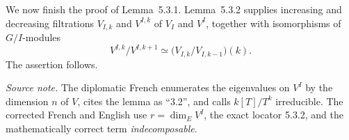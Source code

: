 We now finish the proof of Lemma~5.3.1.  Lemma~5.3.2 supplies increasing and
decreasing filtrations $V_{I,k}$ and $V^{I,k}$ of $V_I$ and $V^I$, together
with isomorphisms of $G/I$-modules
\[
V^{I,k}/V^{I,k+1}\simeq
\bigl(V_{I,k}/V_{I,k-1}\bigr)(k).
\]
The assertion follows.

\medskip
\noindent\emph{Source note.}
The diplomatic French enumerates the eigenvalues on $V^I$ by the dimension
$n$ of $V$, cites the lemma as ``3.2'', and calls $k[T]/T^k$ irreducible.
The corrected French and English use $r=\dim_E V^I$, the exact locator
5.3.2, and the mathematically correct term \emph{indecomposable}.
